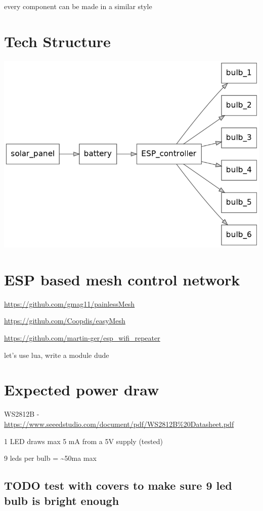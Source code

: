 \documentclass[11pt]{article}
\begin{document}
every component can be made in a similar style

\section{Tech Structure}
\label{sec:org053d793}

\begin{center}
\includegraphics[width=.9\linewidth]{basic.png}
\end{center}

\section{ESP based mesh control network}
\label{sec:org009a833}
\url{https://github.com/gmag11/painlessMesh}

\url{https://github.com/Coopdis/easyMesh}

\url{https://github.com/martin-ger/esp\_wifi\_repeater}

let's use lua, write a module dude

\section{Expected power draw}
\label{sec:org23b5303}
WS2812B - \url{https://www.seeedstudio.com/document/pdf/WS2812B\%20Datasheet.pdf}

1 LED draws max 5 mA from a 5V supply (tested)

9 leds per bulb = \textasciitilde{}50ma max

\subsection{{\bfseries\sffamily TODO} test with covers to make sure 9 led bulb is bright enough}
\label{sec:orga3a1a03}
\end{document}
